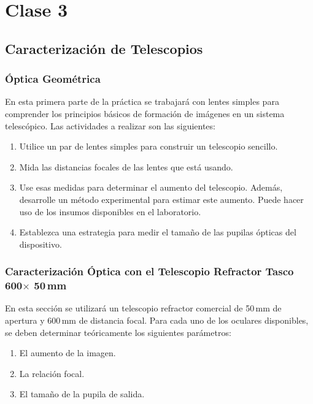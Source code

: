 \chapter{Clase 3}

\section{Caracterización de Telescopios}

\vspace{0.5cm}

\subsection{Óptica Geométrica}

En esta primera parte de la práctica se trabajará con lentes simples para comprender los principios básicos de formación de imágenes en un sistema telescópico. Las actividades a realizar son las siguientes:

\begin{enumerate}
    \item Utilice un par de lentes simples para construir un telescopio sencillo.
    \item Mida las distancias focales de las lentes que está usando.
    \item Use esas medidas para determinar el aumento del telescopio. Además, desarrolle un método experimental para estimar este aumento. Puede hacer uso de los insumos disponibles en el laboratorio.
    \item Establezca una estrategia para medir el tamaño de las pupilas ópticas del dispositivo.
\end{enumerate}

\subsection{\texorpdfstring{Caracterización Óptica con el Telescopio Refractor Tasco 600$\times$ 50\,mm}{Caracterización Óptica con el Telescopio Refractor Tasco 600 x 50 mm}}

En esta sección se utilizará un telescopio refractor comercial de 50\,mm de apertura y 600\,mm de distancia focal. Para cada uno de los oculares disponibles, se deben determinar teóricamente los siguientes parámetros:

\begin{enumerate}
    \item El aumento de la imagen.
    \item La relación focal.
    \item El tamaño de la pupila de salida.
\end{enumerate}

